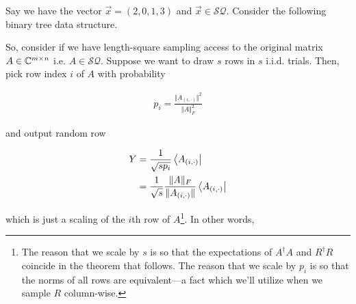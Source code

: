 \documentclass[main.tex]{subfiles}
\begin{document}
\begin{example}
Say we have the vector $\vec{x} = (2, 0, 1, 3)$ and $\vec{x} \in \mathcal{SQ}$. Consider the following binary tree data structure.
\end{example}


So, consider if we have length-square sampling access to the original matrix $A \in \mathbb{C}^{m \times n }$ i.e. $A \in \mathcal{SQ}$. Suppose we want to draw $s$ rows in $s$ i.i.d. trials. Then, pick row index $i$ of $A$ with probability

\begin{align}
\label{def:A-prob}
p_i = \frac{\Vert A_{(i, \cdot)}\Vert^2}{\Vert A \Vert_F^2} 	
\end{align}

and output random row 

\begin{align*}
 	Y &= \frac{1}{\sqrt{s p_i}} \bra{A_{(i, \cdot)}} \\\
 	&= \frac{1}{\sqrt{s}}\frac{\Vert A\Vert_F}{\Vert A_{(i, \cdot)}\Vert}\bra{A_{(i, \cdot)}}
\end{align*}

which is just a scaling of the $i$th row of $A$\footnote{The reason that we scale by $s$ is so that the expectations of $A^\dag A$ and $R^\dag R$ coincide in the theorem that follows. The reason that we scale by $p_i$ is so that the norms of all rows are equivalent---a fact which we'll utilize when we sample $R$ column-wise.}. In other words,
\end{document}
